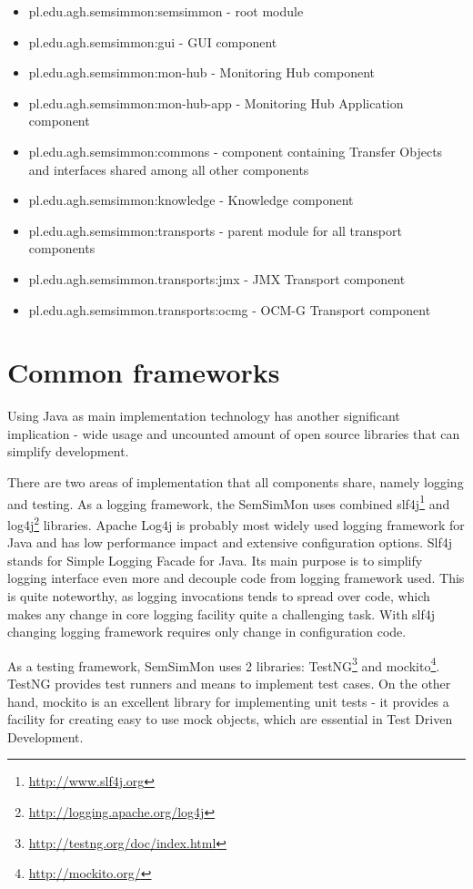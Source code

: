 \begin{itemize}
\item pl.edu.agh.semsimmon:semsimmon - root module
\item pl.edu.agh.semsimmon:gui - GUI component
\item pl.edu.agh.semsimmon:mon-hub - Monitoring Hub component
\item pl.edu.agh.semsimmon:mon-hub-app - Monitoring Hub Application component 
\item pl.edu.agh.semsimmon:commons - component containing Transfer Objects and interfaces shared among all other components
\item pl.edu.agh.semsimmon:knowledge - Knowledge component
\item pl.edu.agh.semsimmon:transports - parent module for all transport components
\item pl.edu.agh.semsimmon.transports:jmx - JMX Transport component
\item pl.edu.agh.semsimmon.transports:ocmg - OCM-G Transport component
\end{itemize}

\section{Common frameworks}

Using Java as main implementation technology has another significant implication - wide usage and uncounted amount of open source libraries that can simplify development.

There are two areas of implementation that all components share, namely logging and testing. As a logging framework, the SemSimMon uses combined slf4j\footnote{\url{http://www.slf4j.org}} and log4j\footnote{\url{http://logging.apache.org/log4j}} libraries. Apache Log4j is probably most widely used logging framework for Java and has low performance impact and extensive configuration options. Slf4j stands for Simple Logging Facade for Java. Its main purpose is to simplify logging interface even more and decouple code from logging framework used. This is quite noteworthy, as logging invocations tends to spread over code, which makes any change in core logging facility quite a challenging task. With slf4j changing logging framework requires only change in configuration code.

As a testing framework, SemSimMon uses 2 libraries: TestNG\footnote{\url{http://testng.org/doc/index.html}} and mockito\footnote{\url{http://mockito.org/}}. TestNG provides test runners and means to implement test cases. On the other hand, mockito is an excellent library for implementing unit tests - it provides a facility for creating easy to use mock objects, which are essential in Test Driven Development.






